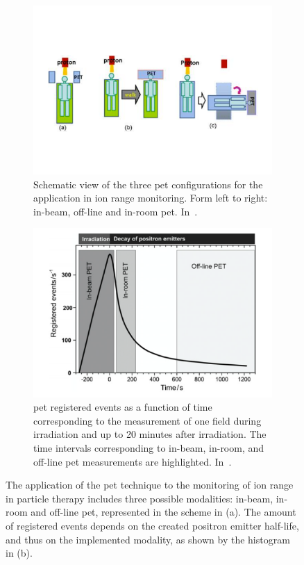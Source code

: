 \begin{figure}[!htbp]
\begin{subfigure}[t]{.49\textwidth}
\centering
\includegraphics[width=0.98\linewidth]{03_GraphicFiles/chapter1_Introduction/PETmodes.pdf}
\caption{Schematic view of the three \gls{pet} configurations for the application in ion range monitoring. Form left to right: in-beam, off-line and in-room \gls{pet}. In~\cite{Zhu2013}.}
\label{chap1::fig::PETmodes}
\end{subfigure}
\begin{subfigure}[t]{.49\textwidth}
\centering
\includegraphics[width=0.92\linewidth]{03_GraphicFiles/chapter1_Introduction/PETactDistr.pdf}
\caption{\gls{pet} registered events as a function of time corresponding to the measurement of one field during
irradiation and up to 20 minutes after irradiation. The time intervals corresponding to  in-beam, in-room, and off-line \gls{pet} measurements are highlighted. In~\cite{Shakirin2011}.}
\label{chap1::fig::PETactDistr}
\end{subfigure}
\caption{The application of the \gls{pet} technique to the monitoring of ion range in particle therapy includes three possible modalities: in-beam, in-room and off-line \gls{pet}, represented in the scheme in (a). The amount of registered events depends on the created positron emitter half-life, and thus on the implemented modality, as shown by the histogram in (b).}
\label{chap1::fig::PETmodalities}
\end{figure} 

